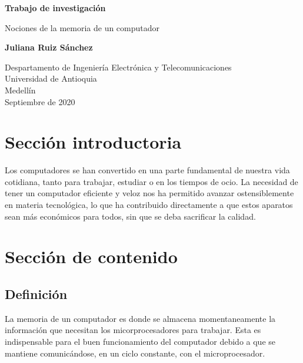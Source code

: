 \documentclass{article}
\begin{document}
\begin{titlepage}
    \begin{center}
        \vspace*{1cm}
            
        \Huge
        \textbf{Trabajo de investigación}
            
        \vspace{0.5cm}
        \LARGE
        Nociones de la memoria de un computador
            
        \vspace{1.5cm}
            
        \textbf{Juliana Ruiz Sánchez}
            
        \vfill
            
        \vspace{0.8cm}
            
        \Large
        Despartamento de Ingeniería Electrónica y Telecomunicaciones\\
        Universidad de Antioquia\\
        Medellín\\
        Septiembre de 2020
            
    \end{center}
\end{titlepage}

\tableofcontents

\section{Sección introductoria}
Los computadores se han convertido en una parte fundamental de nuestra vida cotidiana, tanto para trabajar, estudiar o en los tiempos de ocio. La necesidad de tener un computador eficiente y veloz nos ha permitido avanzar ostensiblemente en materia tecnológica, lo que ha contribuido directamente a que estos aparatos sean más económicos para todos, sin que se deba sacrificar la calidad.


\section{Sección de contenido} \label{contenido}

\subsection{Definición}
La memoria de un computador es donde se almacena momentaneamente la información que necesitan los micorprocesadores para trabajar. Esta es indispensable para el buen funcionamiento del computador debido a que se mantiene comunicándose, en un ciclo constante, con el microprocesador.
\end{document}
